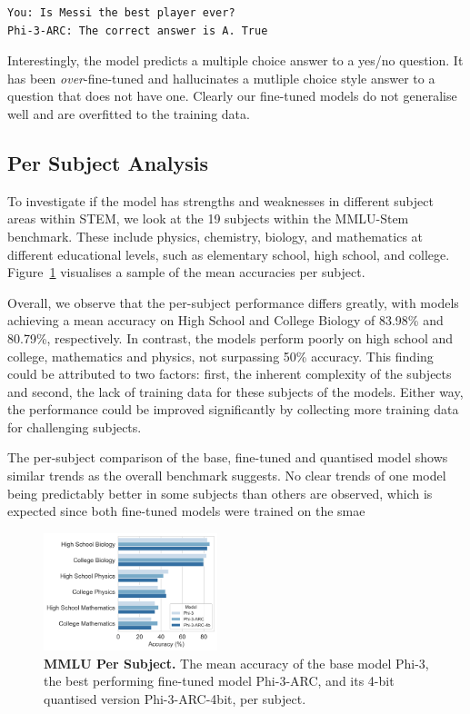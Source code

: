 \begin{lstlisting}[caption={Phi-3-ARC sample}]
You: Is Messi the best player ever? 
Phi-3-ARC: The correct answer is A. True
\end{lstlisting}

Interestingly, the model predicts a multiple choice answer to a yes/no question. It has been \emph{over}-fine-tuned and hallucinates a mutliple choice style answer to a question that does not have one. Clearly our fine-tuned models do not generalise well and are overfitted to the training data.

\subsection{Per Subject Analysis}
\label{subsec:performance-per-subject}

To investigate if the model has strengths and weaknesses in different subject areas within STEM, we look at the 19 subjects within the MMLU-Stem benchmark. These include physics, chemistry, biology, and mathematics at different educational levels, such as elementary school, high school, and college. Figure~\ref{fig:mmlu-per-subject} visualises a sample of the mean accuracies per subject. 

Overall, we observe that the per-subject performance differs greatly, with models achieving a mean accuracy on High School and College Biology of 83.98\% and 80.79\%, respectively. In contrast, the models perform poorly on high school and college, mathematics and physics, not surpassing 50\% accuracy. This finding could be attributed to two factors: first, the inherent complexity of the subjects and second, the lack of training data for these subjects of the models. Either way, the performance could be improved significantly by collecting more training data for challenging subjects.

The per-subject comparison of the base, fine-tuned and quantised model shows similar trends as the overall benchmark suggests. No clear trends of one model being predictably better in some subjects than others are observed, which is expected since both fine-tuned models were trained on the smae 

\begin{figure}
    \centering
    \includegraphics[width=0.45\textwidth]{figures/mmlu-per-subject.png}
    \caption{\textbf{MMLU Per Subject.}
        The mean accuracy of the base model Phi-3, the best performing fine-tuned model Phi-3-ARC, and its 4-bit quantised version Phi-3-ARC-4bit, per subject.
    }
    \label{fig:mmlu-per-subject}
\end{figure}

